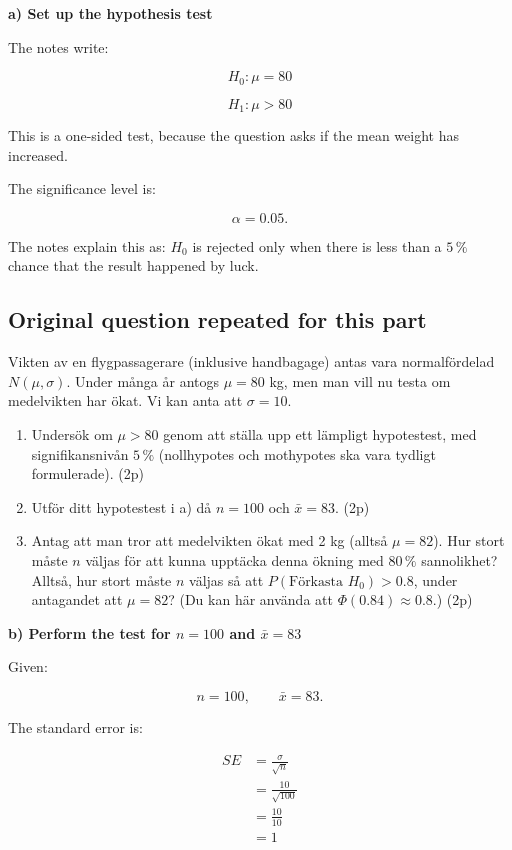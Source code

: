 \documentclass[10pt]{article}
\begin{document}
\textbf{a) Set up the hypothesis test}

The notes write:

\[
H_0:\mu=80
\]

\[
H_1:\mu>80
\]

This is a one-sided test, because the question asks if the mean
weight has increased.

The significance level is:

\[
\alpha=0.05.
\]

The notes explain this as:
$H_0$ is rejected only when there is less than a $5\,\%$ chance that
the result happened by luck.

\subsection*{Original question repeated for this part}
Vikten av en flygpassagerare (inklusive handbagage) antas vara
normalfördelad $N(\mu,\sigma)$. Under många år antogs $\mu=80$ kg,
men man vill nu testa om medelvikten har ökat.
Vi kan anta att $\sigma=10$.

\begin{enumerate}[label=\alph*)]
\item
Undersök om $\mu>80$ genom att ställa upp ett lämpligt hypotestest,
med signifikansnivån $5\,\%$ (nollhypotes och mothypotes ska vara
tydligt formulerade).
\hfill (2p)

\item
Utför ditt hypotestest i a) då $n=100$ och $\bar{x}=83$.
\hfill (2p)

\item
Antag att man tror att medelvikten ökat med 2 kg
(alltså $\mu=82$). Hur stort måste $n$ väljas för att kunna
upptäcka denna ökning med $80\,\%$ sannolikhet?
Alltså, hur stort måste $n$ väljas så att
$P(\text{Förkasta }H_0)>0.8$, under antagandet att $\mu=82$?
(Du kan här använda att $\Phi(0.84)\approx 0.8$.)
\hfill (2p)
\end{enumerate}

\textbf{b) Perform the test for $n=100$ and $\bar{x}=83$}

Given:

\[
n=100,
\qquad
\bar{x}=83.
\]

The standard error is:

\begin{align*}
SE
&=
\frac{\sigma}{\sqrt{n}} \\[2mm]
&=
\frac{10}{\sqrt{100}} \\[2mm]
&=
\frac{10}{10} \\[2mm]
&=1
\end{align*}
\end{document}
